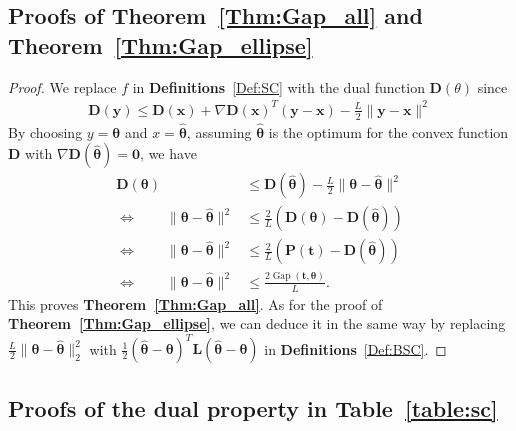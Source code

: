 \documentclass[11pt]{article}
\newcommand{\Gap}{\operatorname{Gap}}
\newcommand{\mat}[1]{\mathbf{#1}}
\renewcommand{\vec}[1]{\bm{#1}}
\begin{document}
\subsection{Proofs of {{\bf Theorem~\ref{Thm:Gap_all}} and {\bf Theorem~\ref{Thm:Gap_ellipse}}}}
\begin{proof}
We replace $f$ in \textbf{Definitions}~\ref{Def:SC} with the dual function $\mat D(\theta)$ since
\begin{equation}
\begin{split}
\mat D(\vec y) \leq \mat D(\vec x) +\nabla \mat D(\vec x)^{T}(\vec y-\vec x) - \frac{L}{2}\|\vec y -\vec x\|^{2}
\end{split}
\end{equation}
By choosing $y = \vec{\theta}$ and $x = \hat{\vec{\theta}}$, assuming $\hat{\vec{\theta}}$ is the optimum for the convex function $\mat D$ with $\nabla \mat D(\hat{\vec{\theta}}) = \vec{0}$, we have\begin{equation}
\begin{split}
\mat D({\vec \theta}) &\leq \mat D(\hat{\vec \theta}) - \frac{L}{2}\|\vec \theta -\hat{\vec \theta}\|^{2}\\
\Longleftrightarrow \quad \quad \|\vec \theta -\hat{\vec \theta}\|^{2} & \leq \frac{2}{L}(\mat D(\vec \theta) - \mat D({\hat{\vec \theta}}))\\
\Longleftrightarrow \quad \quad \|\vec \theta -\hat{\vec \theta}\|^{2} & \leq \frac{2}{L}(\mat P(\vec t) - \mat D({\hat{\vec \theta}}))\\
\Longleftrightarrow \quad \quad \|\vec \theta -\hat{\vec \theta}\|^{2} & \leq \frac{2\Gap(\vec t,\vec \theta)}{L}.
\end{split}
\end{equation}
This proves \textbf{Theorem~\ref{Thm:Gap_all}}. As for the proof of \textbf{Theorem~\ref{Thm:Gap_ellipse}}, we can deduce it in the same way by replacing $\frac{L}{2}\| \vec{\theta} - \hat{\vec{\theta}}\|^2_2$ with $\frac{1}{2}(\hat{\vec{\theta}} - \vec{\theta})^T \mathbf{L}(\hat{\vec{\theta}} - \vec{\theta})$ in \textbf{Definitions}~\ref{Def:BSC}.
\end{proof}

\subsection{Proofs of the dual property in {\bf Table~\ref{table:sc}}}
\end{document}
